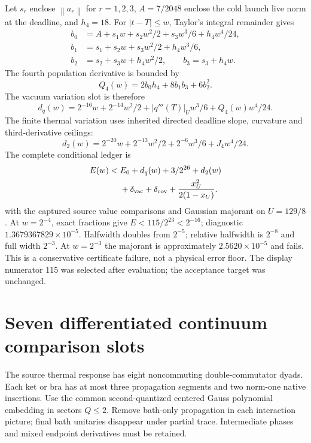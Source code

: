 \documentclass[a4paper,conference]{IEEEtran}
\newcommand{\norm}[1]{\left\|#1\right\|}
\begin{document}
Let $s_r$ enclose $\norm{a_r}$ for $r=1,2,3$, $A=7/2048$ enclose the cold launch live norm at the deadline, and $h_4=18$. For $|t-T|\le w$, Taylor's integral remainder gives
\begin{align}
b_0&=A+s_1w+s_2w^2/2+s_3w^3/6+h_4w^4/24,\\
b_1&=s_1+s_2w+s_3w^2/2+h_4w^3/6,\\
b_2&=s_2+s_3w+h_4w^2/2,\qquad b_3=s_3+h_4w.
\end{align}
The fourth population derivative is bounded by
\begin{equation}
Q_4(w)=2b_0h_4+8b_1b_3+6b_2^2.
\end{equation}
The vacuum variation slot is therefore
\begin{equation}
d_q(w)=2^{-16}w+2^{-14}w^2/2+|q'''(T)|_Uw^3/6+Q_4(w)w^4/24.
\end{equation}
The finite thermal variation uses inherited directed deadline slope, curvature and third-derivative ceilings:
\begin{equation}
d_2(w)=2^{-20}w+2^{-13}w^2/2+2^{-6}w^3/6+J_4w^4/24.
\end{equation}
The complete conditional ledger is
\begin{align}
E(w)<{}& E_0+d_q(w)+3/2^{26}+d_2(w)\\
 &+\delta_{\rm vac}+\delta_{\rm cov}+\frac{x_U^2}{2(1-x_U)}.\nonumber
\end{align}
with the captured source value comparisons and Gaussian majorant on $U=129/8$. At $w=2^{-4}$, exact fractions give $E<115/2^{23}<2^{-16}$; diagnostic $1.3679367829\times10^{-5}$. Halfwidth doubles from $2^{-5}$; relative halfwidth is $2^{-8}$ and full width $2^{-3}$. At $w=2^{-3}$ the majorant is approximately $2.5620\times10^{-5}$ and fails. This is a conservative certificate failure, not a physical error floor. The display numerator 115 was selected after evaluation; the acceptance target was unchanged.

\section{Seven differentiated continuum comparison slots}
The source thermal response has eight noncommuting double-commutator dyads. Each ket or bra has at most three propagation segments and two norm-one native insertions. Use the common second-quantized centered Gauss polynomial embedding in sectors $Q\le2$. Remove bath-only propagation in each interaction picture; final bath unitaries disappear under partial trace. Intermediate phases and mixed endpoint derivatives must be retained.
\end{document}

